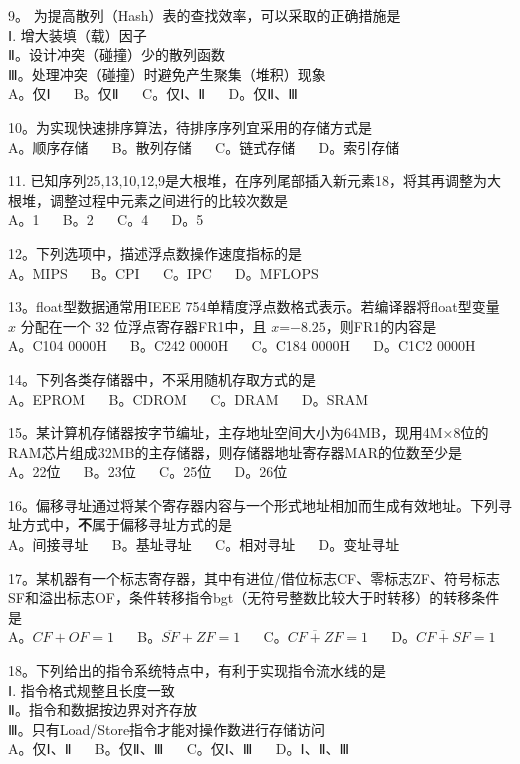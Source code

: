 9。 为提高散列（Hash）表的查找效率，可以采取的正确措施是 \\
Ⅰ. 增大装填（载）因子 \\
Ⅱ。设计冲突（碰撞）少的散列函数 \\
Ⅲ。处理冲突（碰撞）时避免产生聚集（堆积）现象 \\
A。仅Ⅰ $\quad$ B。仅Ⅱ $\quad$ C。仅Ⅰ、Ⅱ $\quad$ D。仅Ⅱ、Ⅲ

10。为实现快速排序算法，待排序序列宜采用的存储方式是 \\
A。顺序存储 $\quad$ B。散列存储 $\quad$ C。链式存储 $\quad$ D。索引存储

11. 已知序列25,13,10,12,9是大根堆，在序列尾部插入新元素18，将其再调整为大根堆，调整过程中元素之间进行的比较次数是 \\
A。1 $\quad$  B。2 $\quad$ C。4 $\quad$ D。5

12。下列选项中，描述浮点数操作速度指标的是 \\
A。MIPS $\quad$ B。CPI $\quad$ C。IPC $\quad$ D。MFLOPS

13。float型数据通常用IEEE 754单精度浮点数格式表示。若编译器将float型变量 $x$ 分配在一个 $32$ 位浮点寄存器FR1中，且 $x$=$-8.25$，则FR1的内容是 \\
A。C104 0000H $\quad$ B。C242 0000H $\quad$ C。C184 0000H $\quad$ D。C1C2 0000H

14。下列各类存储器中，不采用随机存取方式的是 \\
A。EPROM $\quad$ B。CDROM $\quad$ C。DRAM $\quad$ D。SRAM

15。某计算机存储器按字节编址，主存地址空间大小为64MB，现用4M×8位的RAM芯片组成32MB的主存储器，则存储器地址寄存器MAR的位数至少是 \\
A。22位 $\quad$ B。23位 $\quad$ C。25位 $\quad$ D。26位

16。偏移寻址通过将某个寄存器内容与一个形式地址相加而生成有效地址。下列寻址方式中，\textbf{不}属于偏移寻址方式的是 \\
A。间接寻址 $\quad$ B。基址寻址 $\quad$ C。相对寻址 $\quad$ D。变址寻址

17。某机器有一个标志寄存器，其中有进位/借位标志CF、零标志ZF、符号标志SF和溢出标志OF，条件转移指令bgt（无符号整数比较大于时转移）的转移条件是 \\
A。$CF+OF=1$ $\quad$ B。$\overline{SF}+ZF=1$ $\quad$ C。$\overline{CF+ZF}=1$ $\quad$ D。$\overline{CF+SF}=1$

18。下列给出的指令系统特点中，有利于实现指令流水线的是 \\
Ⅰ. 指令格式规整且长度一致 \\
Ⅱ。指令和数据按边界对齐存放 \\
Ⅲ。只有Load/Store指令才能对操作数进行存储访问 \\
A。仅Ⅰ、Ⅱ $\quad$ B。仅Ⅱ、Ⅲ $\quad$ C。仅Ⅰ、Ⅲ $\quad$ D。Ⅰ、Ⅱ、Ⅲ

